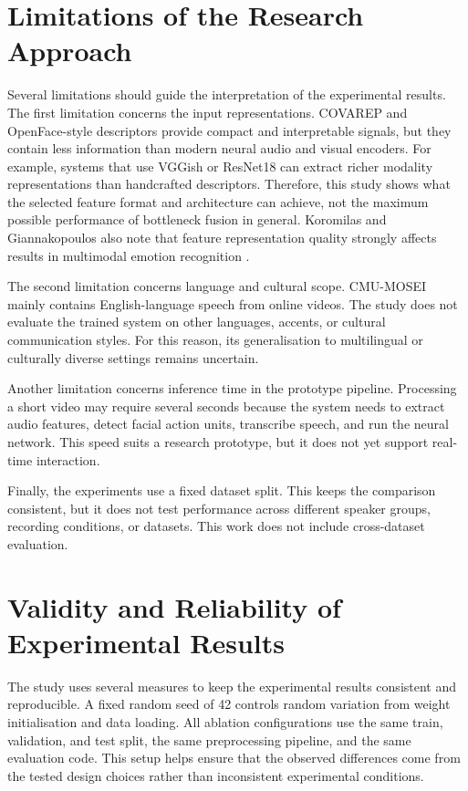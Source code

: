 \section{Limitations of the Research Approach}
\label{sec:limitations}

Several limitations should guide the interpretation of the experimental results. The first limitation concerns the input representations. COVAREP and OpenFace-style descriptors provide compact and interpretable signals, but they contain less information than modern neural audio and visual encoders. For example, systems that use VGGish or ResNet18 can extract richer modality representations than handcrafted descriptors. Therefore, this study shows what the selected feature format and architecture can achieve, not the maximum possible performance of bottleneck fusion in general. Koromilas and Giannakopoulos also note that feature representation quality strongly affects results in multimodal emotion recognition \cite{koromilas2021deep}.

The second limitation concerns language and cultural scope. CMU-MOSEI mainly contains English-language speech from online videos. The study does not evaluate the trained system on other languages, accents, or cultural communication styles. For this reason, its generalisation to multilingual or culturally diverse settings remains uncertain.

Another limitation concerns inference time in the prototype pipeline. Processing a short video may require several seconds because the system needs to extract audio features, detect facial action units, transcribe speech, and run the neural network. This speed suits a research prototype, but it does not yet support real-time interaction.

Finally, the experiments use a fixed dataset split. This keeps the comparison consistent, but it does not test performance across different speaker groups, recording conditions, or datasets. This work does not include cross-dataset evaluation.

\section{Validity and Reliability of Experimental Results}
\label{sec:validity}

The study uses several measures to keep the experimental results consistent and reproducible. A fixed random seed of 42 controls random variation from weight initialisation and data loading. All ablation configurations use the same train, validation, and test split, the same preprocessing pipeline, and the same evaluation code. This setup helps ensure that the observed differences come from the tested design choices rather than inconsistent experimental conditions.

